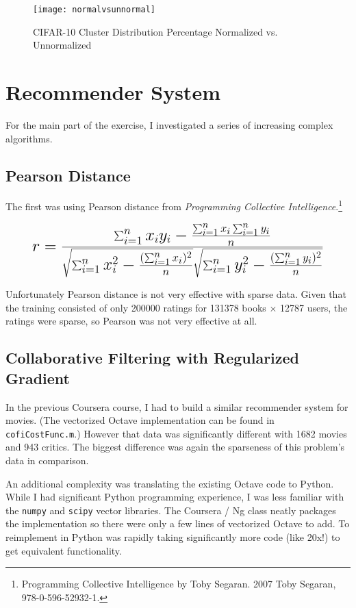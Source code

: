 \documentclass[11pt, oneside]{article}   	%
\begin{document}
\begin{figure}[h!]
\centering
\texttt{[image: normalvsunnormal]}
\caption{CIFAR-10 Cluster Distribution Percentage Normalized vs. Unnormalized}
\end{figure}


\clearpage

\section*{Recommender System}

For the main part of the exercise, I investigated a series of increasing complex algorithms. 

\subsection*{Pearson Distance}

The first was using Pearson distance from \emph{Programming Collective Intelligence}.\footnote{Programming Collective Intelligence by Toby Segaran. \textsuperscript{\textcopyright} 2007 Toby Segaran, 978-0-596-52932-1.}

\begin{equation}
\mathlarger{\mathlarger{\mathlarger{
r = \frac{\sum_{i=1}^n x_iy_i - \frac{\sum_{i=1}^n x_i \sum_{i=1}^n y_i} {n}} 
     { \sqrt{\sum_{i=1}^n x_i^2 - \frac{(\sum_{i=1}^n x_i)^2}{n}} 
        \sqrt{\sum_{i=1}^n y_i^2 - \frac{(\sum_{i=1}^n y_i)^2}{n}} }
}}}
\end{equation}

Unfortunately Pearson distance is not very effective with sparse data. Given that the training consisted of only 200000 ratings for 131378 books $\times$ 12787 users, the ratings were sparse, so Pearson was not very effective at all.

\subsection*{Collaborative Filtering with Regularized Gradient}

\par In the previous Coursera course, I had to build a similar recommender system for movies. (The vectorized Octave implementation can be found in \texttt{cofiCostFunc.m}.) However that data was significantly different with 1682 movies and 943 critics. The biggest difference was again the sparseness of this problem's data in comparison.

An additional complexity was translating the existing Octave code to Python. While I had significant Python programming experience, I was less familiar with the \texttt{numpy} and \texttt{scipy} vector libraries. The Coursera / Ng class neatly packages the implementation so there were only a few lines of vectorized Octave to add. To reimplement in Python was rapidly taking significantly more code (like 20x!) to get equivalent functionality. 
\end{document}
